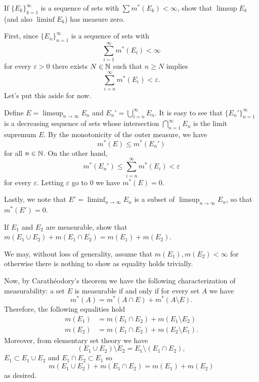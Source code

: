 \begin{problem}
  If ${\{E_k\}}_{k=1}^\infty$ is a sequence of sets with
  $\sum m^*(E_k)<\infty$, show that $\limsup E_k$ (and also $\liminf E_k$)
  has measure zero.
\end{problem}
\begin{solution}
  First, since ${\{E_n\}}_{n=1}^\infty$ is a sequence of sets with
  \[
    \sum_{i=1}^\infty m^*(E_i)<\infty
  \]
  for every $\varepsilon>0$ there exists $N\in\mathbb{N}$ such that $n\geq N$
  implies
  \[
    \sum_{i=n}^\infty m^*(E_i)<\varepsilon.
  \]
  Let's put this aside for now.

  Define $E=\limsup_{n\to\infty} E_n$ and $E_n'=\bigcup_{i=n}^\infty
  E_n$. It is easy to see that ${\{E_n'\}}_{n=1}^\infty$ is a decreasing
  sequence of sets whose intersection $\bigcap_{n=1}^\infty E_n$ is the
  limit supremum $E$. By the monotonicity of the outer measure, we have
  \[
    m^*(E)\leq m^*(E_n')
  \]
  for all $n\in\mathbb{N}$. On the other hand,
  \[
    m^*(E_n')\leq \sum_{i=n}^\infty m^*(E_i)<\varepsilon
  \]
  for every $\varepsilon$. Letting $\varepsilon$ go to $0$ we have
  $m^*(E)=0$.

  Lastly, we note that $E'=\liminf_{n\to\infty} E_n$ is a subset of
  $\limsup_{n\to\infty} E_n$, so that $m^*(E')=0$.
\end{solution}

\begin{problem}
  If $E_1$ and $E_2$ are measurable, show that
  $m(E_1\cup E_2)+m(E_1\cap E_2)=m(E_1)+m(E_2)$.
\end{problem}
\begin{solution}
  We may, without loss of generality, assume that $m(E_1),m(E_2)<\infty$
  for otherwise there is nothing to show as equality holds trivially.

  Now, by Carathéodory's theorem we have the following characterization of
  measurability: a set $E$ is measurable if and only if for every set $A$
  we have
  \[
    m^*(A)=m^*(A\cap E)+m^*(A\setminus E).
  \]
  Therefore, the following equalities hold
  \begin{align*}
    m(E_1)&=m(E_1\cap E_2)+m(E_1\setminus E_2)\\
    m(E_2)&=m(E_1\cap E_2)+m(E_2\setminus E_1).
  \end{align*}
  Moreover, from elementary set theory we have
  \[
    (E_1\cup E_2)\setminus E_2=E_1\setminus (E_1\cap E_2),
  \]
  $E_1\subset E_1\cup E_2$ and $E_1\cap E_2\subset E_1$ so
  \[
    m(E_1\cup E_2)+m(E_1\cap E_2)=m(E_1)+m(E_2)
  \]
  as desired.
\end{solution}

